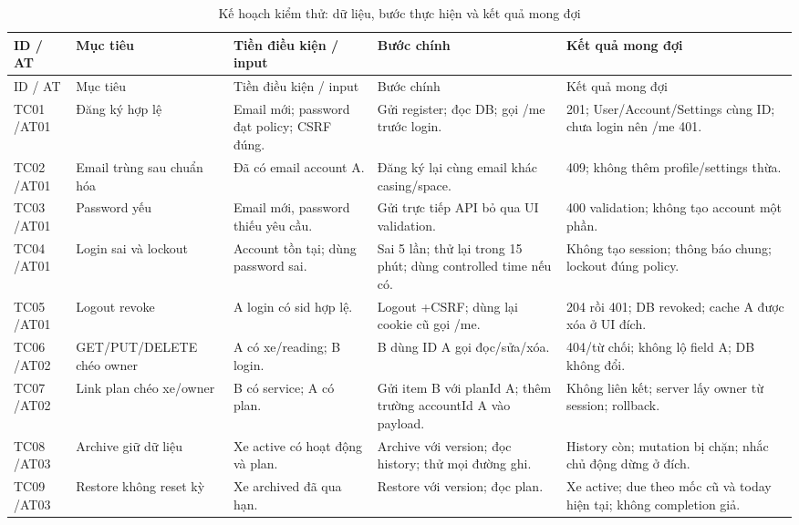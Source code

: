 \begin{smalltable}\begin{longtable}{L{1.2cm}L{2.5cm}L{3.6cm}L{3.6cm}L{3.7cm}}
\caption{Kế hoạch kiểm thử: dữ liệu, bước thực hiện và kết quả mong đợi}\label{tab:testcases}\\
\toprule ID / AT & Mục tiêu & Tiền điều kiện / input & Bước chính & Kết quả mong đợi\\\midrule\endfirsthead
\toprule ID / AT & Mục tiêu & Tiền điều kiện / input & Bước chính & Kết quả mong đợi\\\midrule\endhead
TC01 /\allowbreak  AT01 & Đăng ký hợp lệ & Email mới; password đạt policy; CSRF đúng. & Gửi register; đọc DB; gọi /\allowbreak me trước login. & 201; User/\allowbreak Account/\allowbreak Settings cùng ID; chưa login nên /\allowbreak me 401.\\
TC02 /\allowbreak  AT01 & Email trùng sau chuẩn hóa & Đã có email account A. & Đăng ký lại cùng email khác casing/\allowbreak space. & 409; không thêm profile/\allowbreak settings thừa.\\
TC03 /\allowbreak  AT01 & Password yếu & Email mới,  password thiếu yêu cầu. & Gửi trực tiếp API bỏ qua UI validation. & 400 validation; không tạo account một phần.\\
TC04 /\allowbreak  AT01 & Login sai và lockout & Account tồn tại; dùng password sai. & Sai 5 lần; thử lại trong 15 phút; dùng controlled time nếu có. & Không tạo session; thông báo chung; lockout đúng policy.\\
TC05 /\allowbreak  AT01 & Logout revoke & A login có sid hợp lệ. & Logout +\allowbreak  CSRF; dùng lại cookie cũ gọi /\allowbreak me. & 204 rồi 401; DB revoked; cache A được xóa ở UI đích.\\
TC06 /\allowbreak  AT02 & GET/\allowbreak PUT/\allowbreak DELETE chéo owner & A có xe/\allowbreak reading; B login. & B dùng ID A gọi đọc/\allowbreak sửa/\allowbreak xóa. & 404/\allowbreak từ chối; không lộ field A; DB không đổi.\\
TC07 /\allowbreak  AT02 & Link plan chéo xe/\allowbreak owner & B có service; A có plan. & Gửi item B với planId A; thêm trường accountId A vào payload. & Không liên kết; server lấy owner từ session; rollback.\\
TC08 /\allowbreak  AT03 & Archive giữ dữ liệu & Xe active có hoạt động và plan. & Archive với version; đọc history; thử mọi đường ghi. & History còn; mutation bị chặn; nhắc chủ động dừng ở đích.\\
TC09 /\allowbreak  AT03 & Restore không reset kỳ & Xe archived đã qua hạn. & Restore với version; đọc plan. & Xe active; due theo mốc cũ và today hiện tại; không completion giả.\\

\end{longtable}
\end{smalltable}
